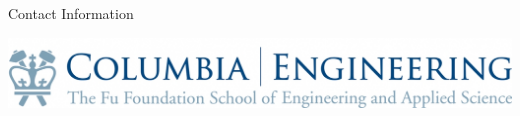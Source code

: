 \documentclass[final]{beamer}
\newlength{\onecolwid}
\begin{document}
\begin{frame}[t]
\begin{columns}[t]
\begin{column}{\onecolwid}
\begin{alertblock}{Contact Information}
\end{alertblock}

\begin{center}
\includegraphics[width=0.8\linewidth]{logo.jpg} %
\end{center}

\end{column} %
\end{columns} %
\end{frame} %
\end{document}
